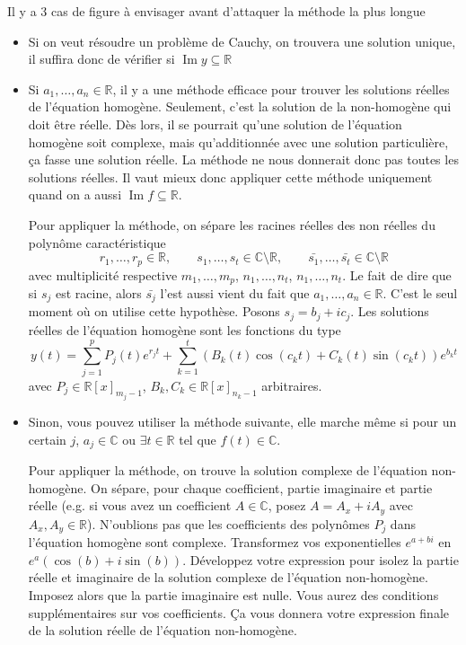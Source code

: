 \documentclass[11pt,a4paper]{article}
\theoremstyle{definition}
\DeclareMathOperator{\newIm}{Im}
\newcommand{\R}{\mathbb{R}}
\newcommand{\C}{\mathbb{C}}
\begin{document}
Il y a 3 cas de figure à envisager avant d'attaquer la méthode la plus longue
\begin{itemize}
	\item Si on veut résoudre un problème de Cauchy, on trouvera une solution unique,
		il suffira donc de vérifier si $\newIm y \subseteq \R$
	\item Si $a_1, \dots, a_n \in \R$,
		il y a une méthode efficace pour trouver les solutions réelles de l'équation homogène.
		Seulement, c'est la solution de la non-homogène qui doit être réelle.
		Dès lors, il se pourrait qu'une solution de l'équation homogène soit complexe,
		mais qu'additionnée avec une solution particulière, ça fasse une solution réelle.
		La méthode ne nous donnerait donc pas toutes les solutions réelles.
		Il vaut mieux donc appliquer cette méthode uniquement quand on a aussi $\newIm f \subseteq \R$.

		Pour appliquer la méthode, on sépare les racines réelles des non réelles du polynôme caractéristique
		\[ r_1, \dots, r_p \in \R, \qquad s_1, \dots, s_t \in \C \setminus \R, \qquad
		\bar{s_1}, \dots, \bar{s_t} \in \C \setminus \R \]
		avec multiplicité respective $m_1, \dots, m_p$, $n_1, \dots, n_t$, $n_1, \dots, n_t$.
		Le fait de dire que si $s_j$ est racine, alors $\bar{s_j}$ l'est aussi vient du fait que $a_1, \dots, a_n \in \R$.
		C'est le seul moment où on utilise cette hypothèse.
		Posons $s_j = b_j + ic_j$.
		Les solutions réelles de l'équation homogène sont les fonctions du type
		\[ y(t) = \sum_{j = 1}^p P_j(t)e^{r_jt} + \sum_{k=1}^t(B_k(t)\cos(c_kt)+C_k(t)\sin(c_kt))e^{b_kt} \]
		avec $P_j \in \R[x]_{m_j-1}$, $B_k, C_k \in \R[x]_{n_k-1}$ arbitraires.
	\item Sinon, vous pouvez utiliser la méthode suivante,
		elle marche même si pour un certain $j$, $a_j \in \C$ ou $\exists t \in \R$ tel que $f(t) \in \C$.

		Pour appliquer la méthode, on trouve la solution complexe de l'équation non-homogène.
		On sépare, pour chaque coefficient, partie imaginaire et partie réelle
		(e.g. si vous avez un coefficient $A \in \C$, posez $A = A_x + iA_y$ avec $A_x, A_y \in \R$).
		N'oublions pas que les coefficients des polynômes $P_j$ dans l'équation homogène sont complexe.
		Transformez vos exponentielles $e^{a + bi}$ en $e^a(\cos(b) + i\sin(b))$.
		Développez votre expression pour isolez la partie réelle et imaginaire de la solution complexe de l'équation non-homogène.
		Imposez alors que la partie imaginaire est nulle.
		Vous aurez des conditions supplémentaires sur vos coefficients.
		Ça vous donnera votre expression finale de la solution réelle de l'équation non-homogène.
\end{itemize}
\end{document}

